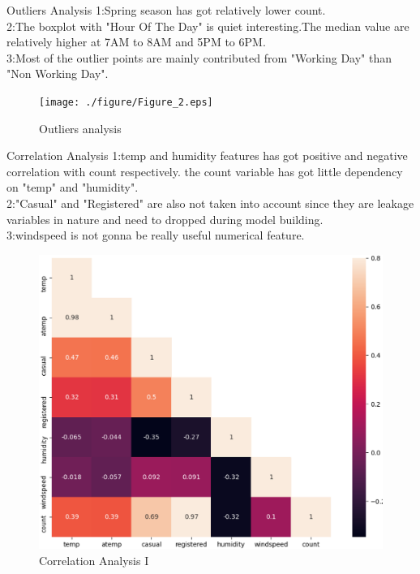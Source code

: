 \documentclass[
 size=14pt,
 paper=smartboard,  %
 mode=present, 		%
 display=slides, 	%
 style=tuliplab,  	%
 pauseslide,
 fleqn,leqno]{powerdot}
\begin{document}
\begin{slide}{Outliers Analysis}
1:Spring season has got relatively lower count. \\
2:The boxplot with "Hour Of The Day" is quiet interesting.The median value are relatively higher at 7AM to 8AM and 5PM to 6PM.\\
3:Most of the outlier points are mainly contributed from "Working Day" than "Non Working Day". 
\begin{figure}[htbp]
	\texttt{[image: ./figure/Figure\_2.eps]}
	\caption{Outliers analysis}
\end{figure}
\end{slide}

\begin{slide}{Correlation Analysis}
	1:temp and humidity features has got positive and negative correlation with count respectively. the count variable has got little dependency on "temp" and "humidity". \\
	2:"Casual" and "Registered" are also not taken into account since they are leakage variables in nature and need to dropped during model building. \\
	3:windspeed is not gonna be really useful numerical feature.
	\begin{figure}[htbp]
		\includegraphics[scale=0.4]{./figure/Figure_3.eps}
		\caption{Correlation Analysis I}
	\end{figure}
\end{slide}
\end{document}
